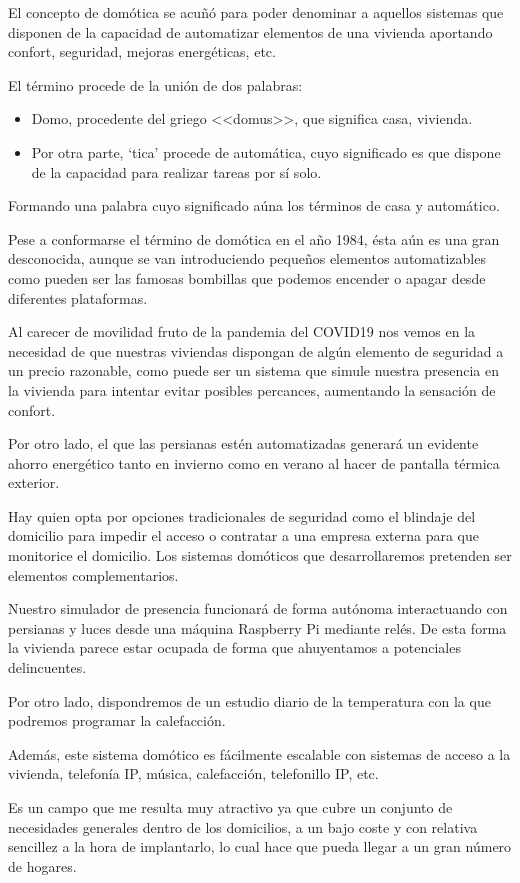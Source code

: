 
El concepto de domótica se acuñó para poder denominar a aquellos sistemas que disponen de la capacidad de automatizar elementos de una vivienda aportando confort, seguridad, mejoras energéticas, etc.

El término procede de la unión de dos palabras:

\begin{itemize}
    \item Domo, procedente del griego <<domus>>, que significa casa, vivienda.
    \item Por otra parte, ‘tica’ procede de automática, cuyo significado es que dispone de la capacidad para realizar tareas por sí solo.
\end{itemize}

Formando una palabra cuyo significado aúna los términos de casa y automático.

Pese a conformarse el término de domótica en el año 1984, ésta aún es una gran desconocida, aunque se van introduciendo pequeños elementos automatizables como pueden ser las famosas bombillas que podemos encender o apagar desde diferentes plataformas.

Al carecer de movilidad fruto de la pandemia del COVID19 nos vemos en la necesidad de que nuestras viviendas dispongan de algún elemento de seguridad a un precio razonable, como puede ser un sistema que simule nuestra presencia en la vivienda para intentar evitar posibles percances, aumentando la sensación de confort.

Por otro lado, el que las persianas estén automatizadas generará un evidente ahorro energético tanto en invierno como en verano al hacer de pantalla térmica exterior.

Hay quien opta por opciones tradicionales de seguridad como el blindaje del domicilio para impedir el acceso o contratar a una empresa externa para que monitorice el domicilio. Los sistemas domóticos que desarrollaremos pretenden ser elementos complementarios.

Nuestro simulador de presencia funcionará de forma autónoma interactuando con persianas y luces desde una máquina Raspberry Pi mediante relés. De esta forma la vivienda parece estar ocupada de forma que ahuyentamos a potenciales delincuentes.

Por otro lado, dispondremos de un estudio diario de la temperatura con la que podremos programar la calefacción.

Además, este sistema domótico es fácilmente escalable con sistemas de acceso a la vivienda, telefonía IP, música, calefacción, telefonillo IP, etc.

Es un campo que me resulta muy atractivo ya que cubre un conjunto de necesidades generales dentro de los domicilios, a un bajo coste y con relativa sencillez a la hora de implantarlo, lo cual hace que pueda llegar a un gran número de hogares.
